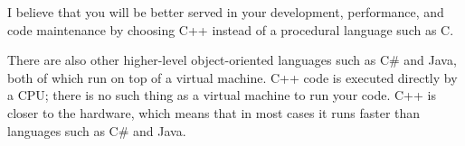I believe that you will be better served in your development, performance, and code maintenance by choosing C++ instead of a procedural language such as C.

There are also other higher-level object-oriented languages such as C\# and Java, both of which run on top of a virtual machine. C++ code is executed directly by a CPU; there is no such thing as a virtual machine to run your code. C++ is closer to the hardware, which means that in most cases it runs faster than languages such as C\# and Java.









